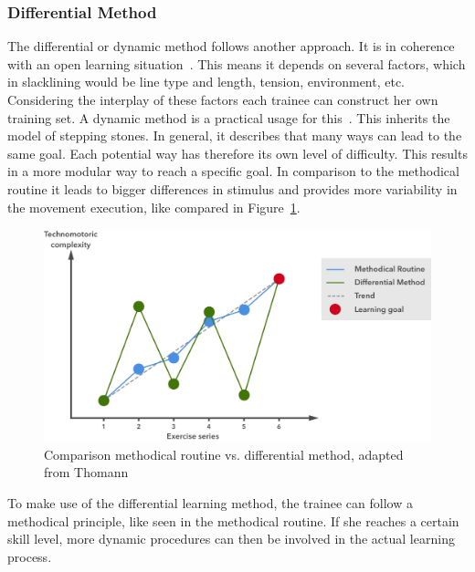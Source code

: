 \subsubsection{Differential Method}
The differential or dynamic method follows another approach. It is in coherence with an open learning situation~\cite{Thomann2013-aa}. This means it depends on several factors, which in slacklining would be line type and length, tension, environment, etc. Considering the interplay of these factors each trainee can construct her own training set.
A dynamic method is a practical usage for this~\cite{Beck2008-dl, Schoellhorn1999-ip}. This inherits the model of stepping stones. In general, it describes that many ways can lead to the same goal. Each potential way has therefore its own level of difficulty. This results in a more modular way to reach a specific goal. In comparison to the methodical routine it leads to bigger differences in stimulus and provides more variability in the movement execution, like compared in Figure~\ref{fig:3_3_1_comparisonMethods}. 

\begin{figure}[htb]
	\centering
	\begin{minipage}[t]{1\linewidth}
		\centering
		\includegraphics[width=1\linewidth]{Pictures/3_3_1_comparisonMethod2}
		\caption{Comparison methodical routine vs. differential method, adapted from Thomann~\cite{Thomann2013-aa}}
		\label{fig:3_3_1_comparisonMethods}
	\end{minipage}
\end{figure}
To make use of the differential learning method, the trainee can follow a methodical principle, like seen in the methodical routine. If she reaches a certain skill level, more dynamic procedures can then be involved in the actual learning process. %

